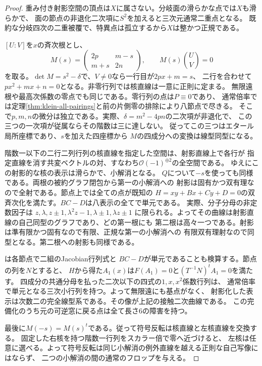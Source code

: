 \begin{proof}
重み付き射影空間の頂点は$X$に属さない。分岐面の滑らかな点では$X$も滑らかで、
面の節点の非退化二次項に$S^2$を加えると三次元通常二重点となる。
既約な分岐四次の二重被覆で、特異点は孤立するから$X$は整かつ正規である。

$[U:V]$を$x$の斉次根とし、
\[
 M(s)=\begin{pmatrix}2p&m-s\\m+s&2n\end{pmatrix},
 \qquad M(s)\binom UV=0
\]
を取る。$\det M=s^2-\delta$で、$V\ne0$なら一行目が$2px+m=s$、
二行を合わせて$px^2+mx+n=0$となる。非零行列では核直線は一意に正則に定まる。
無限遠根や最高次係数の零点でも同じである。零行列の点は$P\equiv0$であり、
通常倍率では定理\ref{thm:klein-all-pairings}と前の片側零の排除により八節点で尽きる。
そこで$p,m,n$の微分は独立である。実際、$\delta=m^2-4pn$の二次項が非退化で、
この三つの一次項が従属ならその階数は三に達しない。
従ってこの三つはエタール局所座標であり、$s$を加えた四座標から
$M$の四成分への変換は線型同型になる。

階数一以下の二行二列行列の核直線を指定した空間は、射影直線上で各行が
指定直線を消す共変ベクトルの対、すなわち$\mathcal O(-1)^{\oplus2}$の全空間である。
ゆえにこの射影的な核の表示は滑らかで、小解消となる。
$Q$について$-s$を使っても同様である。両根の被約グラフ閉包から第一の小解消への
射影は固有かつ双有理なので全射である。節点上では全ての点が既知の
$H=xy+Bx+Cy+D=0$の双斉次化を満たす。$BC-D$は八表示の全てで単元である。
実際、分子分母の非定数因子は
$z,\lambda,z\pm1,\lambda^2z-1,\lambda\pm1,\lambda z\pm1$
に限られる。よってその曲線は射影直線の自己同型のグラフであり、どの第一根にも
第二根は高々一つである。射影は準有限かつ固有なので有限、正規な第一の小解消への
有限双有理射なので同型となる。第二根への射影も同様である。

は各節点で二組のJacobian行列式と
$BC-D$が単元であることも検算する。節点の列を$N$とすると、
$H$から得た$A_1(x)$は$F(A_1)=0$と$(T^{-1}N)^t A_1=0$を満たす。
四成分の共通分母を払った二次以下の四式の$1,x,x^2$係数行列は、
通常倍率で単元となる三次小行列を持つ。よって無限遠にも基点がなく、
射影化した表示は次数二の完全線型系である。その像が上記の接触二次曲線である。
この完備化のうち元の可逆窓に戻る点は全て長さ6の障害を持つ。

最後に$M(-s)=M(s)^t$である。従って符号反転は核直線と左核直線を交換する。
固定した右核を持つ階数一行列をスカラー倍で零へ近づけると、
左核は任意に選べる。よって符号反転は同じ小解消の例外直線を越える正則な自己写像にはならず、
二つの小解消の間の通常のフロップを与える。
\end{proof}
